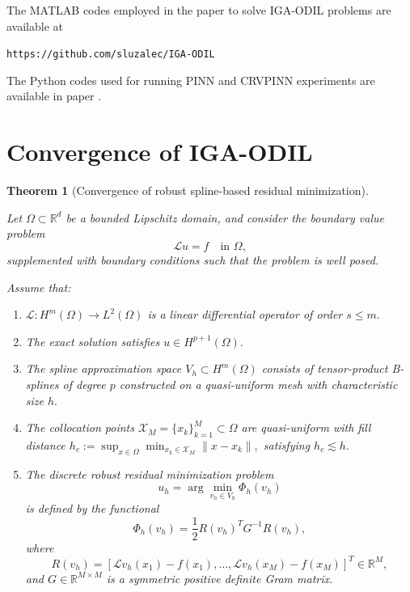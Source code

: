 \documentclass[review]{elsarticle}
\newtheorem{theorem}{Theorem}
\begin{document}
The MATLAB codes employed in the paper to solve IGA-ODIL problems are available at

{\tt https://github.com/sluzalec/IGA-ODIL}

The Python codes used for running PINN and CRVPINN experiments are available in paper \cite{crvpinn}.


\section{Convergence of IGA-ODIL}

\begin{theorem}[Convergence of robust spline-based residual minimization]
\label{thm:robust_iga_odil}

Let $\Omega \subset \mathbb{R}^d$ be a bounded Lipschitz domain, and consider the boundary value problem
\begin{equation}
\mathcal{L}u = f
\quad \text{in } \Omega,
\label{eq:general_pde}
\end{equation}
supplemented with boundary conditions such that the problem is well posed.

Assume that:

\begin{enumerate}

\item
$\mathcal{L}:H^m(\Omega)\to L^2(\Omega)$
is a linear differential operator of order
$
s\le m.
$

\item
The exact solution satisfies
$
u\in H^{p+1}(\Omega).
$

\item
The spline approximation space
$
V_h\subset H^m(\Omega)
$
consists of tensor-product B-splines of degree
$
p
$
constructed on a quasi-uniform mesh with characteristic size
$
h.
$

\item
The collocation points
$
\mathcal{X}_M=\{x_k\}_{k=1}^M\subset\Omega
$
are quasi-uniform with fill distance
$
h_c
:=
\sup_{x\in\Omega}
\min_{x_k\in\mathcal{X}_M}
\|x-x_k\|,
$
satisfying
$
h_c\lesssim h.
$

\item
The discrete robust residual minimization problem
\begin{equation}
u_h
=
\arg\min_{v_h\in V_h}
\Phi_h(v_h)
\label{eq:robust_discrete_problem}
\end{equation}
is defined by the functional
\begin{equation}
\Phi_h(v_h)
=
\frac12
R(v_h)^T
G^{-1}
R(v_h),
\label{eq:robust_functional}
\end{equation}
where
\begin{equation}
R(v_h)
=
\left[
\mathcal{L}v_h(x_1)-f(x_1),
\dots,
\mathcal{L}v_h(x_M)-f(x_M)
\right]^T
\in\mathbb{R}^M,
\end{equation}
and
$
G\in\mathbb{R}^{M\times M}
$
is a symmetric positive definite Gram matrix.


\end{enumerate}
\end{theorem}
\end{document}
